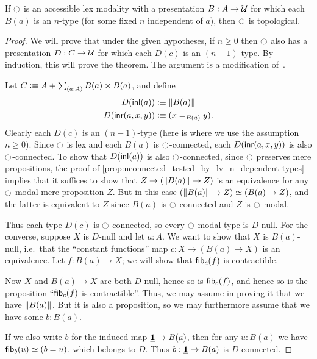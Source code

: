 \begin{thm}\label{thm:acc-ntypes-tpl}
  If ${\ocircle}$ is an accessible lex modality with a presentation $B:A\to\mathcal{U}$ for which each $B(a)$ is an $n$-type (for some fixed $n$ independent of $a$), then ${\ocircle}$ is topological.
\end{thm}
\begin{proof}
  We will prove that under the given hypotheses, if $n\ge 0$ then ${\ocircle}$ also has a presentation $D:C\to \mathcal{U}$ for which each $D(c)$ is an $(n-1)$-type.
  By induction, this will prove the theorem.
  The argument is a modification of~\cite[Lemma 7.5.11]{hottbook}.

  Let $C\defeq A + \sm{a:A} B(a)\times B(a)$, and define
  \begin{align*}
    D({\mathsf{inl}}(a)) &\vcentcolon\equiv \Vert B(a)\Vert_{}\\
    D({\mathsf{inr}}(a,x,y)) &\vcentcolon\equiv (x=_{B(a)} y).
  \end{align*}
  Clearly each $D(c)$ is an $(n-1)$-type (here is where we use the assumption $n\ge 0$).
  Since ${\ocircle}$ is lex and each $B(a)$ is ${\ocircle}$-connected, each $D({\mathsf{inr}}(a,x,y))$ is also ${\ocircle}$-connected.
  To show that $D({\mathsf{inl}}(a))$ is also ${\ocircle}$-connected, since ${\ocircle}$ preserves mere propositions, the proof of \cref{prop:nconnected_tested_by_lv_n_dependent types} implies that it suffices to show that $Z\to (\Vert B(a)\Vert_{} \to Z)$ is an equivalence for any ${\ocircle}$-modal mere proposition $Z$.
  But in this case $(\Vert B(a)\Vert_{} \to Z) \simeq (B(a) \to Z)$, and the latter is equivalent to $Z$ since $B(a)$ is ${\ocircle}$-connected and $Z$ is ${\ocircle}$-modal.

  Thus each type $D(c)$ is ${\ocircle}$-connected, so every ${\ocircle}$-modal type is $D$-null.
  For the converse, suppose $X$ is $D$-null and let $a:A$.
  We want to show that $X$ is $B(a)$-null, i.e.\ that the ``constant functions'' map $c : X\to (B(a) \to X)$ is an equivalence.
  Let $f:B(a) \to X$; we will show that $\mathsf{fib}_{c}(f)$ is contractible.

  Now $X$ and $B(a)\to X$ are both $D$-null, hence so is $\mathsf{fib}_{c}(f)$, and hence so is the proposition ``$\mathsf{fib}_{c}(f)$ is contractible''.
  Thus, we may assume in proving it that we have $\Vert B(a)\Vert_{}$.
  But it is also a proposition, so we may furthermore assume that we have some $b:B(a)$.

  If we also write $b$ for the induced map $\underline{\mathbf{1}} \to B(a)$, then for any $u:B(a)$ we have $\mathsf{fib}_{b}(u) \simeq (b=u)$, which belongs to $D$.
  Thus $b:\underline{\mathbf{1}}\to B(a)$ is $D$-connected.


\end{proof}
